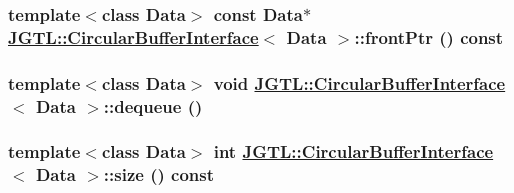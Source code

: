\hypertarget{class_j_g_t_l_1_1_circular_buffer_interface_09caa74b3e297749a06316b04c6fcfbf}{
\subsubsection[frontPtr]{\setlength{\rightskip}{0pt plus 5cm}template$<$class Data$>$ const Data$\ast$ \hyperlink{class_j_g_t_l_1_1_circular_buffer_interface}{JGTL::Circular\-Buffer\-Interface}$<$ Data $>$::front\-Ptr () const}}
\label{class_j_g_t_l_1_1_circular_buffer_interface_09caa74b3e297749a06316b04c6fcfbf}


\hypertarget{class_j_g_t_l_1_1_circular_buffer_interface_c51208639f563639b965b860111c590a}{
\subsubsection[dequeue]{\setlength{\rightskip}{0pt plus 5cm}template$<$class Data$>$ void \hyperlink{class_j_g_t_l_1_1_circular_buffer_interface}{JGTL::Circular\-Buffer\-Interface}$<$ Data $>$::dequeue ()}}
\label{class_j_g_t_l_1_1_circular_buffer_interface_c51208639f563639b965b860111c590a}


\hypertarget{class_j_g_t_l_1_1_circular_buffer_interface_00e36734faa3138a061f31c523dfb01b}{
\subsubsection[size]{\setlength{\rightskip}{0pt plus 5cm}template$<$class Data$>$ int \hyperlink{class_j_g_t_l_1_1_circular_buffer_interface}{JGTL::Circular\-Buffer\-Interface}$<$ Data $>$::size () const}}
\label{class_j_g_t_l_1_1_circular_buffer_interface_00e36734faa3138a061f31c523dfb01b}


